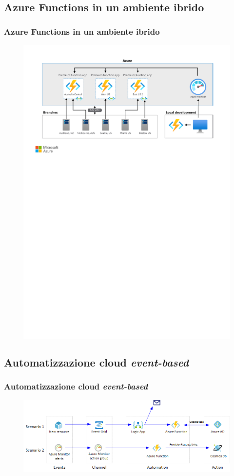 \documentclass{beamer}
\begin{document}
	\subsection{Azure Functions in un ambiente ibrido}
	\begin{frame}
		\frametitle{Azure Functions in un ambiente ibrido}
		\begin{figure}
			\includegraphics[width=\textwidth]{img/azure-functions-hybrid.pdf}
		\end{figure}
	\end{frame}
	
	\subsection{Automatizzazione cloud \emph{event-based}}
	\begin{frame}
		\frametitle{Automatizzazione cloud \emph{event-based}}
		\begin{figure}
			\includegraphics[width=\textwidth]{img/cloud-automation.png}
		\end{figure}
	\end{frame}
	
\end{document}
